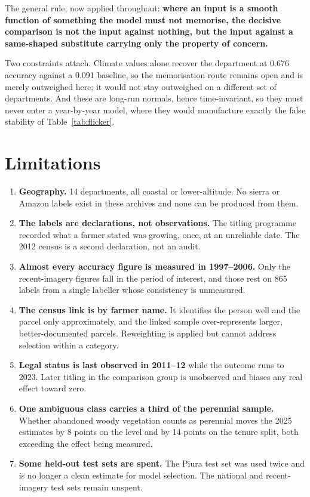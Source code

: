 \documentclass[11pt,a4paper]{article}
\begin{document}
The general rule, now applied throughout: \textbf{where an input is a smooth function of
something the model must not memorise, the decisive comparison is not the input against nothing,
but the input against a same-shaped substitute carrying only the property of concern.}

Two constraints attach. Climate values alone recover the department at 0.676 accuracy against a
0.091 baseline, so the memorisation route remains open and is merely outweighed here; it would
not stay outweighed on a different set of departments. And these are long-run normals, hence
time-invariant, so they must never enter a year-by-year model, where they would manufacture
exactly the false stability of Table~\ref{tab:flicker}.

\section{Limitations}

\begin{enumerate}[leftmargin=1.6em,itemsep=3pt]
\item \textbf{Geography.} 14 departments, all coastal or lower-altitude. No sierra or Amazon
labels exist in these archives and none can be produced from them.

\item \textbf{The labels are declarations, not observations.} The titling programme recorded what
a farmer stated was growing, once, at an unreliable date. The 2012 census is a second
declaration, not an audit.

\item \textbf{Almost every accuracy figure is measured in 1997--2006.} Only the recent-imagery
figures fall in the period of interest, and those rest on 865 labels from a single labeller whose
consistency is unmeasured.

\item \textbf{The census link is by farmer name.} It identifies the person well and the parcel
only approximately, and the linked sample over-represents larger, better-documented parcels.
Reweighting is applied but cannot address selection within a category.

\item \textbf{Legal status is last observed in 2011--12} while the outcome runs to 2023. Later
titling in the comparison group is unobserved and biases any real effect toward zero.

\item \textbf{One ambiguous class carries a third of the perennial sample.} Whether abandoned
woody vegetation counts as perennial moves the 2025 estimates by 8 points on the level and by 14
points on the tenure split, both exceeding the effect being measured.

\item \textbf{Some held-out test sets are spent.} The Piura test set was used twice and is no
longer a clean estimate for model selection. The national and recent-imagery test sets remain
unspent.
\end{enumerate}
\end{document}
